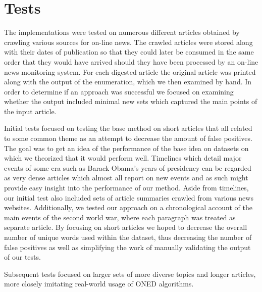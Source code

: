 \section{Tests}
The implementations were tested on numerous different articles obtained by crawling various sources for on-line news. The crawled articles were stored along with their dates of publication so that they could later be consumed in the same order that they would have arrived should they have been processed by an on-line news monitoring system. For each digested article the original article was printed along with the output of the enumeration, which we then examined by hand. In order to determine if an approach was successful we focused on examining whether the output included minimal new sets which captured the main points of the input article.

Initial tests focused on testing the base method on short articles that all related to some common theme as an attempt to decrease the amount of false positives. The goal was to get an idea of the performance of the base idea on datasets on which we theorized that it would perform well. Timelines which detail major events of some era such as Barack Obama's years of presidency can be regarded as very dense articles which almost all report on new events and as such might provide easy insight into the performance of our method. Aside from timelines, our initial test also included sets of article summaries crawled from various news websites. Additionally, we tested our approach on a chronological account of the main events of the second world war, where each paragraph was treated as separate article. By focusing on short articles we hoped to decrease the overall number of unique words used within the dataset, thus decreasing the number of false positives as well as simplifying the work of manually validating the output of our tests.

Subsequent tests focused on larger sets of more diverse topics and longer articles, more closely imitating real-world usage of ONED algorithms.
